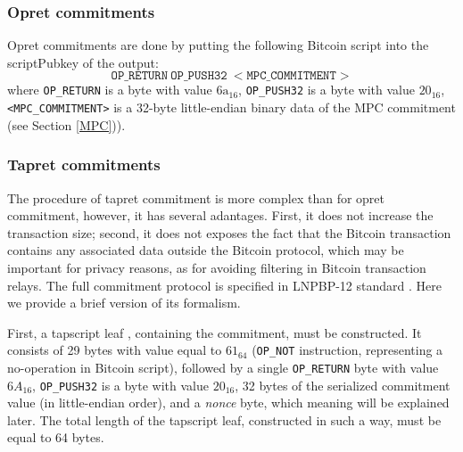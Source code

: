 \documentclass[9pt,oneside]{amsart}
\begin{document}
\begin{multicols}{2}
\subsubsection{Opret commitments}\label{Opret}

Opret commitments are done by putting the following Bitcoin script into the \textsf{scriptPubkey}
of the output:
\noindent
\begin{equation}
    \mathtt{OP\_RETURN\ OP\_PUSH32\ <MPC\_COMMITMENT>}
\end{equation}
where \verb|OP_RETURN| is a byte with value $\mathrm{6a}_{16}$,
\verb|OP_PUSH32| is a byte with value $20_{16}$,
\verb|<MPC_COMMITMENT>| is a 32-byte little-endian binary data of the MPC commitment
(see Section \ref{MPC})).

\subsubsection{Tapret commitments}\label{Tapret}

The procedure of tapret commitment is more complex than for opret commitment,
however, it has several adantages.
First, it does not increase the transaction size;
second, it does not exposes the fact that the Bitcoin transaction contains any associated
data outside the Bitcoin protocol, which may be important for privacy reasons,
as for avoiding filtering in Bitcoin transaction relays.
The full commitment protocol is specified in LNPBP-12 standard \cite{LNPBP12}.
Here we provide a brief version of its formalism.

First, a tapscript leaf \cite{BIP342}, containing the commitment, must be constructed.
It consists of 29 bytes with value equal to $61_{64}$
(\texttt{OP\_NOT} instruction, representing a no-operation in Bitcoin script),
followed by a single \texttt{OP\_RETURN} byte with value $6A_{16}$,
\texttt{OP\_PUSH32} is a byte with value $20_{16}$,
32 bytes of the serialized commitment value (in little-endian order),
and a \emph{nonce} byte, which meaning will be explained later.
The total length of the tapscript leaf, constructed in such a way, must be equal to 64 bytes.


\end{multicols}
\end{document}
